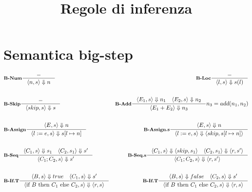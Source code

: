 \documentclass[a4paper, 10pt]{article}
\date{}
\newcommand{\infer}[4]{\inference[\textbf{#1}]{#2}{#3}#4 }
\newcommand{\brule}[2]{\langle #1 \rangle \Downarrow #2}
\newcommand{\memrep}[3]{#1 \lbrack #2 \mapsto #3 \rbrack}
\newcommand{\ifthenelse}[3]{\text{if } #1 \text{ then } #2 \text{ else } #3}
\begin{document}
	\title{\textbf{Regole di inferenza}}
	\maketitle
	\section*{Semantica big-step}
	\begin{align*}
		&\infer{B-Num}{-}{\brule{n,s}{n}}{}
		&\infer{B-Loc}{-}{\brule{l,s}{s(l)}}{} \\ \\
		&\infer{B-Skip}{-}{\brule{skip,s}{s}}{} 
		&\infer{B-Add}{\brule{E_1,s}{n_1} \quad \brule{E_2,s}{n_2}}{\brule{E_1+E_2}{n_3}}{n_3 = add(n_1, n_2)} \\ \\
		&\infer{B-Assign}{\brule{E,s}{n}}{\brule{l:=e,s}{\memrep{s}{l}{n}}}{}  &\infer{B-Assign.s}{\brule{E,s}{n}}{\brule{l:=e,s}{\langle skip, \memrep{s}{l}{n}} \rangle}{}  \\ \\
		&\infer{B-Seq}{\brule{C_1,s}{s_1} \quad \brule{C_2,s_1}{s'} }{\brule{C_1;C_2,s}{s'}}{} 
		&\infer{B-Seq.s}{\brule{C_1,s}{\langle skip,s_1 \rangle} \quad \brule{C_2,s_1}{\langle r,s' \rangle} }{\brule{C_1;C_2,s}{\langle r,s' \rangle}}{} \\ \\
		&\infer{B-If.T}{\brule{B,s}{true} \quad \brule{C_1,s}{s'}}{\brule{\ifthenelse{B}{C_1}{C_2},s}{\langle r, s\rangle}}{} 
		&\infer{B-If.T}{\brule{B,s}{false} \quad \brule{C_2,s}{s'}}{\brule{\ifthenelse{B}{C_1}{C_2},s}{\langle r, s\rangle}}{} \\ \\
	\end{align*}
\end{document}
